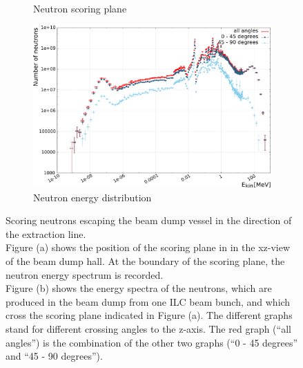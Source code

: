 \begin{figure}[hbp]
\centering
  \begin{subfigure}[b]{0.4\textwidth}
   \centering
   \caption{Neutron scoring plane}
   \end{subfigure}
   \hfill
    \begin{subfigure}[b]{0.59\textwidth}
   \centering
    \includegraphics[width=\textwidth]{Figures/BeamDump/Neutron_spectrum_final_BeamDump_hall.png}
   \caption{Neutron energy distribution}
   \end{subfigure}
\caption[Neutron scoring plane in the main beam dump hall]{Scoring neutrons escaping the beam dump vessel in the direction of the extraction line.
\\Figure (a) shows the position of the scoring plane in \fluka in the xz-view of the beam dump hall.
At the boundary of the scoring plane, the neutron energy spectrum is recorded.
\\Figure (b) shows the energy spectra of the neutrons, which are produced in the beam dump \designone from one ILC beam bunch, and which cross the scoring plane indicated in Figure (a).
The different graphs stand for different crossing angles to the z-axis.
The red graph (``all angles'') is the combination of the other two graphs (``0 - 45 degrees'' and ``45 - 90 degrees'').}
\label{fig:BeamDumps:NeutronScoring}
\end{figure}

